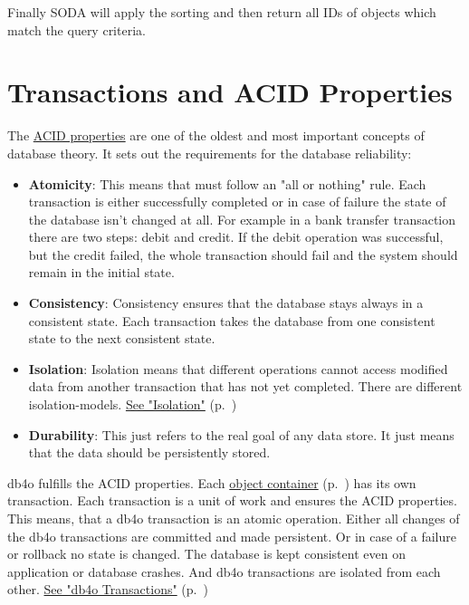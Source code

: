 Finally SODA will apply the sorting and then return all IDs of objects which match the query criteria.

\section{Transactions and ACID Properties}
\label{ref:basics-acid-and-transactions}

The \href{http://en.wikipedia.org/wiki/ACID}{ACID properties} are one of the oldest and most important concepts of database theory. It sets out the requirements for the database reliability:

\begin{itemize}
\item \textbf{Atomicity}: This means that must follow an "all or nothing" rule. Each transaction is either successfully completed or in case of failure the state of the database isn't changed at all.\newline{} For example in a bank transfer transaction there are two steps: debit and credit. If the debit operation was successful, but the credit failed, the whole transaction should fail and the system should remain in the initial state.
\item \textbf{Consistency}: Consistency ensures that the database stays always in a consistent state. Each transaction takes the database from one consistent state to the next consistent state.
\item \textbf{Isolation}: Isolation means that different operations cannot access modified data from another transaction that has not yet completed. There are different isolation-models. \hyperref[ref:basics-acid-and-transactions-isolation]{See "Isolation"} (p.~\pageref{ref:basics-acid-and-transactions-isolation})
\item \textbf{Durability}: This just refers to the real goal of any data store. It just means that the data should be persistently stored.
\end{itemize}

db4o fulfills the ACID properties. Each \hyperref[ref:basics-object-container]{object container} (p.~\pageref{ref:basics-object-container}) has its own transaction. Each transaction is a unit of work and ensures the ACID properties. This means, that a db4o transaction is an atomic operation. Either all changes of the db4o transactions are committed and made persistent. Or in case of a failure or rollback no state is changed. The database is kept consistent even on application or database crashes. And db4o transactions are isolated from each other. \hyperref[ref:basics-acid-and-transactions-db4o-tx-basics]{See "db4o Transactions"} (p.~\pageref{ref:basics-acid-and-transactions-db4o-tx-basics})

